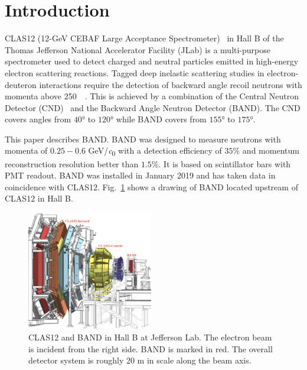 \documentclass[3p,final,twocolumn]{elsarticle}
\begin{document}
\linenumbers


\setcounter{footnote}{0}
\renewcommand{\thefootnote}{\alph{footnote}}
\section{Introduction}


CLAS12 (12-GeV CEBAF Large Acceptance
Spectrometer)~\cite{Burkert:2020akg} in Hall B of the Thomas Jefferson
National Accelerator Facility (JLab) is a multi-purpose spectrometer
used to detect charged and neutral particles emitted in high-energy
electron scattering reactions.  Tagged deep inelastic scattering studies
in electron-deuteron interactions require the detection of backward
angle recoil
neutrons with momenta above \SI{250}{\mega\eVperc}.
This is achieved by a combination of the Central Neutron Detector
(CND)~\cite{Chatagnon:2020lwt} and the Backward Angle Neutron Detector
(BAND). The CND covers angles from $40$\si{\degree} to
$120$\si{\degree} while BAND covers from $155$\si{\degree} to
$175$\si{\degree}.

This paper describes BAND. BAND was designed to measure neutrons with
momenta of $0.25 - 0.6$ \si{\GeV/\clight} with a detection efficiency
of $35$\% and momentum reconstruction resolution better than
$1.5\%$. It is based on scintillator bars with PMT readout.  BAND was
installed in January 2019 and has taken data in coincidence with
CLAS12. Fig.~\ref{fig:clas12band} shows a drawing of BAND located
upstream of CLAS12 in Hall B.


\begin{figure}[t!]
	\centering
	\includegraphics[width=0.49\textwidth]{BandInClas.png}
        \caption{CLAS12 and BAND in Hall B at Jefferson Lab. The
          electron beam is incident from the right side. BAND is
          marked in red. The overall detector system is roughly 20
          \si{\meter} in scale along the beam axis. }
		\label{fig:clas12band}
\end{figure}
\end{document}
